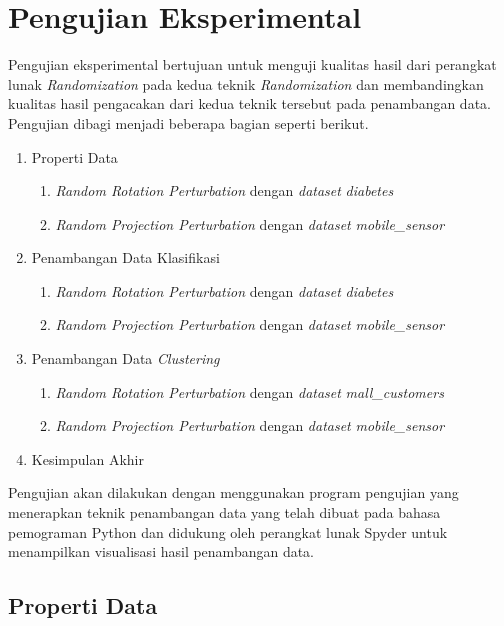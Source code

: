 \section{Pengujian Eksperimental}
\label{sec:pengujianeksperimental}

Pengujian eksperimental bertujuan untuk menguji kualitas hasil dari perangkat lunak \textit{Randomization} pada kedua teknik \textit{Randomization} dan membandingkan kualitas hasil pengacakan dari kedua teknik tersebut pada penambangan data. Pengujian dibagi menjadi beberapa bagian seperti berikut.

\begin{enumerate}
	\item Properti Data
	\begin{enumerate}
		\item \textit{Random Rotation Perturbation} dengan \textit{dataset} \textit{diabetes}
		\item \textit{Random Projection Perturbation} dengan \textit{dataset} \textit{mobile\_sensor}
	\end{enumerate}
	\item Penambangan Data Klasifikasi
	\begin{enumerate}
		\item \textit{Random Rotation Perturbation} dengan \textit{dataset} \textit{diabetes}
		\item \textit{Random Projection Perturbation} dengan \textit{dataset} \textit{mobile\_sensor}
	\end{enumerate}
	\item Penambangan Data \textit{Clustering}
	\begin{enumerate}
		\item \textit{Random Rotation Perturbation} dengan \textit{dataset} \textit{mall\_customers}
		\item \textit{Random Projection Perturbation} dengan \textit{dataset} \textit{mobile\_sensor}
	\end{enumerate}
	\item Kesimpulan Akhir
\end{enumerate}

Pengujian akan dilakukan dengan menggunakan program pengujian yang menerapkan teknik penambangan data yang telah dibuat pada bahasa pemograman Python dan didukung oleh perangkat lunak Spyder untuk menampilkan visualisasi hasil penambangan data.

\subsection{Properti Data}
\label{subsec:pengujian-properti}

